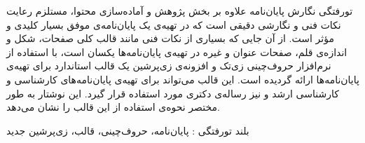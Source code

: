 


\pagestyle{empty}

\begin{وسط‌چین}
\end{وسط‌چین}

‌تورفتگی نگارش پایان‌نامه‌ علاوه بر بخش پژوهش و آماده‌سازی محتوا،
مستلزم رعایت نکات فنی و نگارشی دقیقی است 
که در تهیه‌ی یک پایان‌نامه‌ی موفق بسیار کلیدی و مؤثر است.
از آن جایی که بسیاری از نکات فنی مانند قالب کلی صفحات، شکل و اندازه‌ی قلم، 
صفحات عنوان و غیره در تهیه‌ی پایان‌نامه‌ها یکسان است،
با استفاده از نرم‌افزار حروف‌چینی زی‌تک %
و افزونه‌ی زی‌پرشین %
یک قالب استاندارد برای تهیه‌ی پایان‌نامه‌ها ارائه گردیده است.
این قالب می‌تواند برای تهیه‌ی پایان‌نامه‌های
کارشناسی و کارشناسی ارشد و نیز رساله‌ی دکتری مورد استفاده قرار گیرد.
این نوشتار به طور مختصر نحوه‌ی استفاده از این قالب را نشان می‌دهد.

‌بلند
‌تورفتگی : 
پایان‌نامه، حروف‌چینی، قالب، زی‌پرشین
‌جدید
